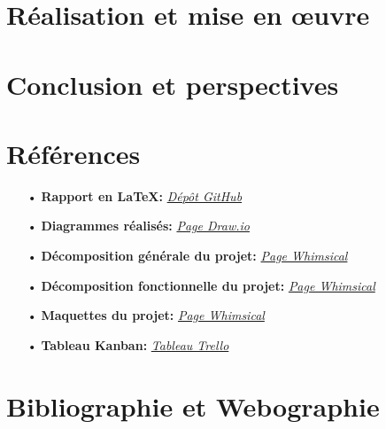 \documentclass[a4paper]{report}
\begin{document}
\begin{doublespace}
	\chapter{Réalisation et mise en œuvre}
	\fancyhead[L]{\hspace*{5cm}}
	

	\chapter{Conclusion et perspectives}
	\fancyhead[L]{\hspace*{5cm}}
	

	\newpage

	\appendix
	 \setcounter{page}{1}
	\chapter{Références}

	\begin{itemize}
		\item[•] \textbf{Rapport en \LaTeX:} \href{https://github.com/abdorah/stage2021/blob/master/rapport.tex}{\textit{Dépôt GitHub}}
		\item[•] \textbf{Diagrammes réalisés:} \href{https://viewer.diagrams.net/?tags=&highlight=0000ff&edit=_blank&layers=1&nav=1&title=Diagram.drawio#Uhttps%3A%2F%2Fraw.githubusercontent.com%2Fabdorah%2Fstage2021%2Fmaster%2Fdiagramms%2FDiagram.drawio}{\textit{Page Draw.io}}
		\item[•] \textbf{Décomposition générale du projet:} \href{https://whimsical.com/kdi-EkDMmetu6dBHRpCbyDF1yy}{\textit{Page Whimsical}}
		\item[•] \textbf{Décomposition fonctionnelle du projet:} \href{https://whimsical.com/wbs-kpi-9BDZ7oPFWEhvz9qQGoQEdL}{\textit{Page Whimsical}}
		\item[•] \textbf{Maquettes du projet:} \href{https://whimsical.com/kdi-ux-design-J9PD866564ibwyMBwLHN9N}{\textit{Page Whimsical}}
		\item[•] \textbf{Tableau Kanban:} \href{https://trello.com/invite/b/QCUhh5sY/900fa738fc6c66193db04199e1248ae6/suivitransport}{\textit{Tableau Trello}}
	\end{itemize}

	\chapter{Bibliographie et Webographie}


\end{doublespace}
\end{document}
